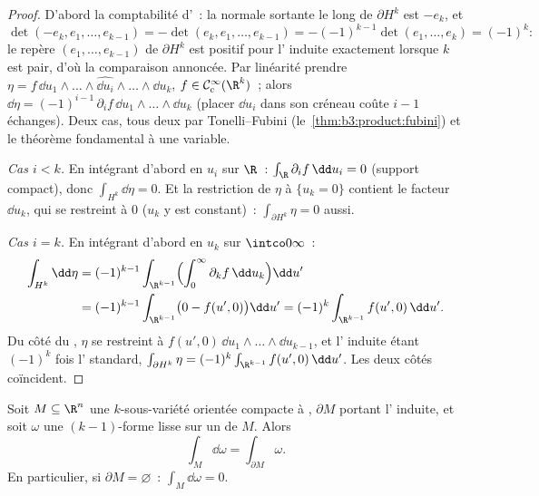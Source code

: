 \begin{proof}
D'abord la comptabilité d'~: la normale sortante
le long de $\partial H^k$ est $-e_k$, et
\[
\det(-e_k, e_1, \dots, e_{k-1}) =
-\det(e_k, e_1, \dots, e_{k-1}) = -(-1)^{k-1}\det(e_1,
\dots, e_k) = (-1)^k :
\]
le repère $(e_1, \dots, e_{k-1})$ de $\partial H^k$ est
positif pour l' induite exactement lorsque $k$ est
pair, d'où la comparaison annoncée. Par linéarité prendre
$\eta = f\,\dd u_1\wedge\dots\wedge\widehat{\dd
u_i}\wedge\dots\wedge\dd u_k$, $f \in \mathcal
C^\infty_c(\R^k)$~; alors $\dd\eta =
(-1)^{i-1}\,\partial_if\,\dd u_1\wedge\dots\wedge\dd u_k$
(placer $\dd u_i$ dans son créneau coûte $i - 1$ échanges).
Deux cas, tous deux par Tonelli--Fubini
(le~\cref{thm:b3:product:fubini}) et le théorème fondamental
à une variable.

\emph{Cas $i < k$.} En intégrant d'abord en $u_i$ sur $\R$~:
$\int_\R\partial_if\,\dd u_i = 0$ (support compact), donc
$\int_{H^k}\dd\eta = 0$. Et la restriction de $\eta$ à
$\{u_k = 0\}$ contient le facteur $\dd u_k$, qui se restreint
à $0$ ($u_k$ y est constant)~: $\int_{\partial H^k}\eta = 0$
aussi.

\emph{Cas $i = k$.} En intégrant d'abord en $u_k$ sur
$\intco0\infty$~:
\begin{align*}
\int_{H^k}\dd\eta &= (-1)^{k-1}\int_{\R^{k-1}}
\Bigl(\int_0^\infty\partial_kf\,\dd u_k\Bigr)\dd u' \\
&= (-1)^{k-1}\int_{\R^{k-1}}\bigl(0 - f(u', 0)\bigr)\dd u'
= (-1)^k\int_{\R^{k-1}}f(u',0)\,\dd u' .
\end{align*}
Du côté du , $\eta$ se restreint à $f(u', 0)\,\dd
u_1\wedge\dots\wedge\dd u_{k-1}$, et l' induite
étant $(-1)^k$ fois l' standard,
$\int_{\partial H^k}\eta =
(-1)^k\int_{\R^{k-1}}f(u',0)\,\dd u'$. Les deux côtés
coïncident.
\end{proof}

\begin{theorem}[Stokes]\label{thm:b3:forms:stokes}
Soit $M \subseteq \R^n$ une $k$-sous-variété orientée compacte
à , $\partial M$ portant l' induite, et soit
$\omega$ une $(k-1)$-forme lisse sur un  de $M$.
Alors
\[
\int_M\dd\omega = \int_{\partial M}\omega .
\]
En particulier, si $\partial M = \varnothing$~:
$\int_M\dd\omega = 0$.
\end{theorem}

